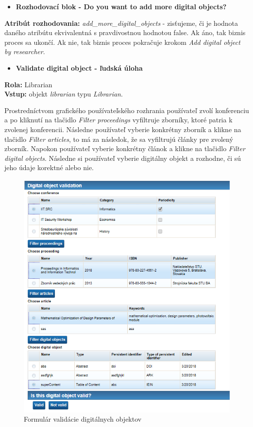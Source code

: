 \documentclass[10pt,oneside,slovak,a4paper]{article}
\begin{document}
\begin{itemize}
\item \textbf{Rozhodovací blok - Do you want to add more digital objects?}
\end{itemize}

\textbf{Atribút rozhodovania:} \textit{add\_more\_digital\_objects} - zisťujeme, či je hodnota daného atribútu ekvivalentná s pravdivostnou hodnotou false. Ak áno, tak biznis proces sa ukončí. Ak nie, tak biznis proces pokračuje krokom \textit{Add digital object by researcher}.

\begin{itemize}
\item \textbf{Validate digital object
 - ľudská úloha}
\end{itemize}

\textbf{Rola:} Librarian\\
\textbf{Vstup:} objekt \textit{librarian} typu \textit{Librarian}.

Prostredníctvom grafického používateľského rozhrania používateľ zvolí konferenciu a po kliknutí na tlačidlo \textit{Filter proceedings} vyfiltruje zborníky, ktoré patria k zvolenej konferencii. Následne používateľ vyberie konkrétny zborník a klikne na tlačidlo \textit{Filter articles}, to má za následok, že sa vyfiltrujú články pre zvolený zborník. Napokon používateľ vyberie konkrétny článok a klikne na tlačidlo \textit{Filter digital objects}. Následne si používateľ vyberie digitálny objekt a rozhodne, či sú jeho údaje korektné alebo nie.

\begin{figure} [H]
\centering
\includegraphics[scale=0.4]{forms/do_validation.png} 
\caption{Formulár validácie digitálnych objektov}
\end{figure}
\end{document}

